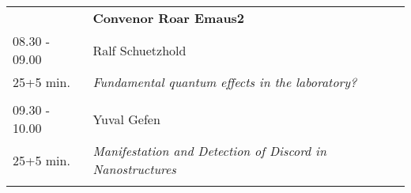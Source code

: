 \begin{longtable}{p{3cm}p{13cm}}
&\hfill {\bf Convenor Roar Emaus2 }\\ 
08.30 - 09.00 & Ralf Schuetzhold\\ 
25+5 min. & {\it Fundamental quantum effects in the laboratory?}\\ 
 & \\ 
09.30 - 10.00 & Yuval Gefen\\ 
25+5 min. & {\it Manifestation and Detection of Discord in Nanostructures}\\ 
 & \\ 
\end{longtable}

